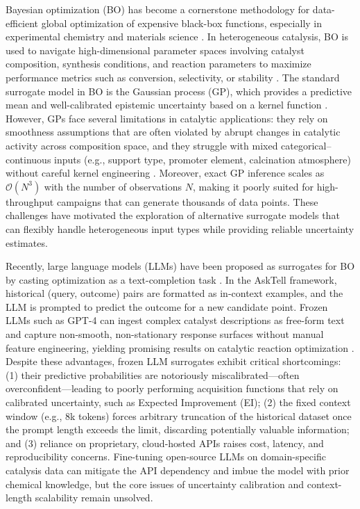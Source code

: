 \documentclass{article}
\begin{document}
Bayesian optimization (BO) has become a cornerstone methodology for data-efficient global optimization of expensive black-box functions, especially in experimental chemistry and materials science \cite{shahriari2016taking}. In heterogeneous catalysis, BO is used to navigate high-dimensional parameter spaces involving catalyst composition, synthesis conditions, and reaction parameters to maximize performance metrics such as conversion, selectivity, or stability \cite{green2020closed}. The standard surrogate model in BO is the Gaussian process (GP), which provides a predictive mean and well-calibrated epistemic uncertainty based on a kernel function \cite{rasmussen2006gaussian}. However, GPs face several limitations in catalytic applications: they rely on smoothness assumptions that are often violated by abrupt changes in catalytic activity across composition space, and they struggle with mixed categorical–continuous inputs (e.g., support type, promoter element, calcination atmosphere) without careful kernel engineering \cite{hase2018phoenics}. Moreover, exact GP inference scales as $\mathcal{O}(N^3)$ with the number of observations $N$, making it poorly suited for high-throughput campaigns that can generate thousands of data points. These challenges have motivated the exploration of alternative surrogate models that can flexibly handle heterogeneous input types while providing reliable uncertainty estimates.

Recently, large language models (LLMs) have been proposed as surrogates for BO by casting optimization as a text-completion task \cite{rankovic2023large}. In the AskTell framework, historical (query, outcome) pairs are formatted as in-context examples, and the LLM is prompted to predict the outcome for a new candidate point. Frozen LLMs such as GPT-4 \cite{openai2023gpt4} can ingest complex catalyst descriptions as free-form text and capture non-smooth, non-stationary response surfaces without manual feature engineering, yielding promising results on catalytic reaction optimization \cite{liang2024language}. Despite these advantages, frozen LLM surrogates exhibit critical shortcomings: (1) their predictive probabilities are notoriously miscalibrated—often overconfident—leading to poorly performing acquisition functions that rely on calibrated uncertainty, such as Expected Improvement (EI); (2) the fixed context window (e.g., 8k tokens) forces arbitrary truncation of the historical dataset once the prompt length exceeds the limit, discarding potentially valuable information; and (3) reliance on proprietary, cloud-hosted APIs raises cost, latency, and reproducibility concerns. Fine-tuning open-source LLMs on domain-specific catalysis data can mitigate the API dependency and imbue the model with prior chemical knowledge, but the core issues of uncertainty calibration and context-length scalability remain unsolved.
\end{document}
